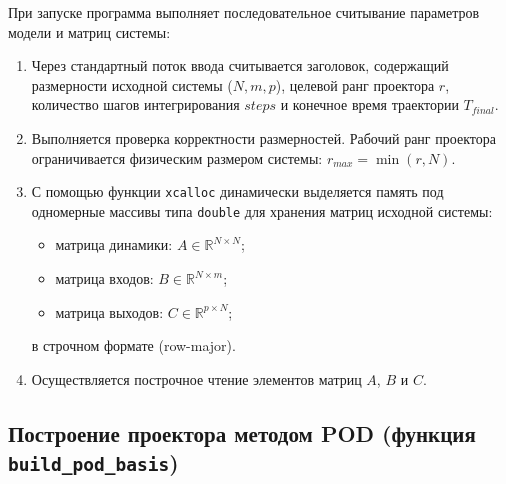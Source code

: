 \documentclass[12pt, a4paper, oneside]{extarticle}
\begin{document}
При запуске программа выполняет последовательное считывание параметров модели и
матриц системы:
\begin{enumerate}
    \item Через стандартный поток ввода считывается заголовок, содержащий
    размерности исходной системы ($N, m, p$), целевой ранг проектора $r$,
    количество шагов интегрирования $steps$ и конечное время траектории
    $T_{final}$.

    \item Выполняется проверка корректности размерностей. Рабочий ранг
    проектора ограничивается физическим размером системы:
    $r_{max} = \min(r, N)$.

    \item С помощью функции \texttt{xcalloc} динамически выделяется память под
    одномерные массивы типа \texttt{double} для хранения матриц исходной
    системы:
    \begin{itemize}
        \item матрица динамики: $A \in \mathbb{R}^{N \times N}$;
        \item матрица входов: $B \in \mathbb{R}^{N \times m}$;
        \item матрица выходов: $C \in \mathbb{R}^{p \times N}$;
    \end{itemize}
    в строчном формате (row-major).

    \item Осуществляется построчное чтение элементов матриц $A$, $B$ и $C$.
\end{enumerate}

\subsection{Построение проектора методом POD (функция \texttt{build\_pod\_basis})}
\end{document}

